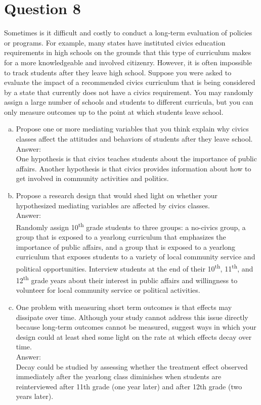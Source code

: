\documentclass[11pt,notitlepage]{article}\usepackage[]{graphicx}\usepackage[]{color}
\begin{document}
\section*{Question 8}
Sometimes is it difficult and costly to conduct a long-term evaluation of policies or programs. For example, many states have instituted civics education requirements in high schools on the grounds that this type of curriculum makes for a more knowledgeable and involved citizenry. However, it is often impossible to track students after they leave high school. Suppose you were asked to evaluate the impact of a recommended civics curriculum that is being considered by a state that currently does not have a civics requirement. You may randomly assign a large number of schools and students to different curricula, but you can only measure outcomes up to the point at which students leave school.

\begin{enumerate}[a)]
\item Propose one or more mediating variables that you think explain why civics classes affect the attitudes and behaviors of students after they leave school. \\
Answer:\\
One hypothesis is that civics teaches students about the importance of public affairs.  Another hypothesis is that civics provides information about how to get involved in community activities and politics.

\item Propose a research design that would shed light on whether your hypothesized mediating variables are affected by civics classes.\\
Answer:\\
Randomly assign 10\textsuperscript{th} grade students to three groups: a no-civics group, a group that is exposed to a yearlong curriculum that emphasizes the importance of public affairs, and a group that is exposed to a yearlong curriculum that exposes students to a variety of local community service and political opportunities.  Interview students at the end of their 10\textsuperscript{th}, 11\textsuperscript{th}, and 12\textsuperscript{th} grade years about their interest in public affairs and willingness to volunteer for local community service or political activities.  

\item One problem with measuring short term outcomes is that effects may dissipate over time. Although your study cannot address this issue directly because long-term outcomes cannot be measured, suggest ways in which your design could at least shed some light on the rate at which effects decay over time.\\
Answer:\\
Decay could be studied by assessing whether the treatment effect observed immediately after the yearlong class diminishes when students are reinterviewed after 11th grade (one year later) and after 12th grade (two years later).

\end{enumerate}
\end{document}
